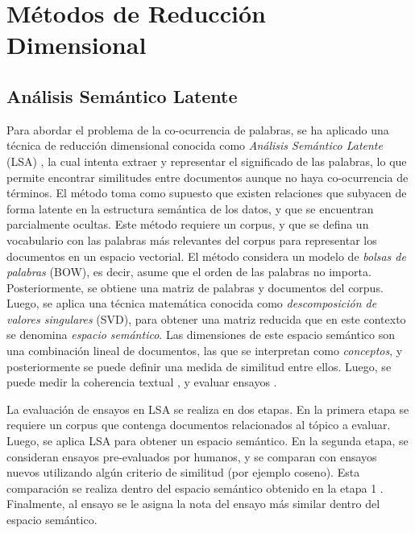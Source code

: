 \documentclass[12pt]{diicc}
\begin{document}
\section{Métodos de Reducción Dimensional}

\subsection{Análisis Semántico Latente}

Para abordar el problema de la co-ocurrencia de palabras, se ha aplicado una técnica de reducción dimensional conocida como {\em Análisis Semántico Latente} (LSA) \cite{t28}, la cual intenta extraer y representar el significado de las palabras, lo que permite encontrar similitudes entre documentos aunque no haya co-ocurrencia de términos. El método toma como supuesto que existen relaciones que subyacen de forma latente en la estructura semántica de los datos, y que se encuentran parcialmente ocultas. Este método requiere un corpus, y que se defina un vocabulario con las palabras más relevantes del corpus para representar los documentos en un espacio vectorial. El método considera un modelo de {\em bolsas de palabras} (BOW), es decir, asume que el orden de las palabras no importa. Posteriormente, se obtiene una matriz de palabras y documentos del corpus. Luego, se aplica una técnica matemática conocida como {\em descomposición de valores singulares} (SVD), para obtener una matriz reducida que en este contexto se denomina {\em espacio semántico}. Las dimensiones de este espacio semántico son una combinación lineal de documentos, las que se interpretan como {\em conceptos}, y posteriormente se puede definir una medida de similitud entre ellos. Luego, se puede medir la coherencia textual \cite{t8} \cite{t10} \cite{t20} \cite{t29}, y evaluar ensayos \cite{t9}. 

La evaluación de ensayos en LSA se realiza en dos etapas. En la primera etapa se requiere un corpus que contenga documentos relacionados al tópico a evaluar. Luego, se aplica LSA para obtener un espacio semántico. En la segunda etapa, se consideran ensayos pre-evaluados por humanos, y se comparan con ensayos nuevos utilizando algún criterio de similitud (por ejemplo coseno). Esta comparación se realiza dentro del espacio semántico obtenido en la etapa 1 \cite{t10}. Finalmente, al ensayo se le asigna la nota del ensayo más similar dentro del espacio semántico.
\end{document}
